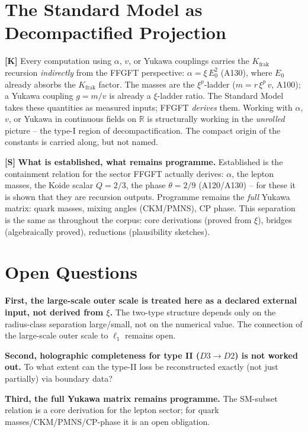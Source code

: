 \section{The Standard Model as Decompactified Projection}

\textbf{[K]} Every computation using $\alpha$, $v$, or Yukawa couplings carries
the $K_\text{frak}$ recursion \emph{indirectly} from the FFGFT perspective:
$\alpha=\xi\,E_0^2$ (A130), where $E_0$ already absorbs the $K_\text{frak}$ factor.
The masses are the $\xi^p$-ladder ($m=r\,\xi^p\,v$, A100); a Yukawa coupling
$g=m/v$ is already a $\xi$-ladder ratio. The Standard Model takes these quantities
as measured inputs; FFGFT \emph{derives} them. Working with $\alpha$, $v$, or
Yukawa in continuous fields on $\mathbb{R}$ is structurally working in the
\emph{unrolled} picture -- the type-I region of decompactification. The compact
origin of the constants is carried along, but not named.

\textbf{[S]} \textbf{What is established, what remains programme.} Established is
the containment relation for the sector FFGFT actually derives: $\alpha$, the
lepton masses, the Koide scalar $Q=2/3$, the phase $\theta=2/9$ (A120/A130) -- for
these it is shown that they are recursion outputs. Programme remains the \emph{full}
Yukawa matrix: quark masses, mixing angles (CKM/PMNS), CP phase. This separation
is the same as throughout the corpus: core derivations (proved from $\xi$), bridges
(algebraically proved), reductions (plausibility sketches).

\section{Open Questions}

\textbf{First, the large-scale outer scale is treated here as a declared external
input, not derived from $\xi$.} The two-type structure depends only on the
radius-class separation large/small, not on the numerical value. The connection
of the large-scale outer scale to $\ell_1$ remains open.

\textbf{Second, holographic completeness for type II ($D3\to D2$) is not worked
out.} To what extent can the type-II loss be reconstructed exactly (not just
partially) via boundary data?

\textbf{Third, the full Yukawa matrix remains programme.} The SM-subset relation
is a core derivation for the lepton sector; for quark masses/CKM/PMNS/CP-phase
it is an open obligation.

